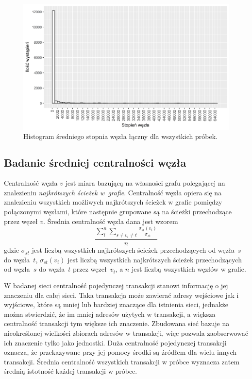 \documentclass[12pt, twoside, final, openany]{mgr}
\newcommand{\chartsWidth}{0.8}
\begin{document}
\begin{figure}[H]
   \includegraphics[width=\chartsWidth\linewidth]{pictures/sredni_stopien_wezla/sredni_stopien_wezla_hist.png}
   \caption{Histogram średniego stopnia węzła łączny dla wszystkich próbek.}
   \label{fig:sw3}
\end{figure}

\subsection{Badanie średniej centralności węzła}
\label{srednia_centralnosc}
\indent Centralność węzła $v$ jest miara bazującą na własności grafu polegającej na znalezieniu \textit{najkrótszych ścieżek w~grafie}. Centralność węzła opiera się na znalezieniu wszystkich możliwych najkrótszych ścieżek w grafie pomiędzy połączonymi węzłami, które następnie grupowane są na ścieżki przechodzące przez węzeł $v$. Średnia centralność węzła dana jest wzorem 
\begin{equation}
\label{eq:centralnosc}
  \frac{\sum_i^n\sum_{s \ne v_i \ne t}^{}\frac{\sigma_{st}(v_i)}{\sigma_{st}}}{n}
\end{equation} 
gdzie $\sigma_{st}$ jest liczbą wszystkich najkrótszych ścieżek przechodzących od węzła~$s$ do węzła~$t$, $\sigma_{st}(v_i)$ jest liczbą wszystkich najkrótszych ścieżek przechodzących od węzła~$s$ do węzła~$t$ przez węzeł~$v_i$, a $n$ jest liczbą wszystkich węzłów w grafie.

\indent W badanej sieci centralność pojedynczej transakcji stanowi informację o jej znaczeniu dla całej sieci. Taka transakcja może zawierać adresy wejściowe jak i wyjściowe, które są mniej lub bardziej znaczące dla istnienia sieci, jednakże można stwierdzić, że im mniej adresów użytych w transakcji, a większa centralność transakcji tym większe ich znaczenie. Zbudowana sieć bazuje na nieokreślonej wielkości zbiorach adresów w transakcji, więc pozwala zaobserwować ich znaczenie tylko jako jednostki. Duża centralność pojedynczej transakcji oznacza, że przekazywane przy jej pomocy środki są źródłem dla wielu innych transakcji. Średnia centralność wszystkich transakcji w próbce wyznacza zatem średnią istotność każdej transakcji w próbce.
\end{document}
